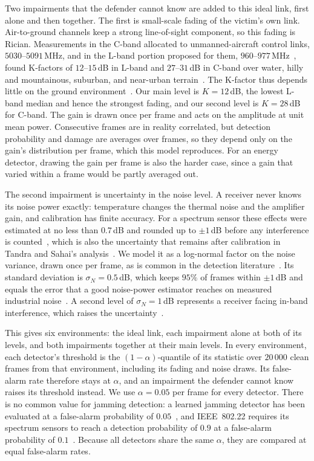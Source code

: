 Two impairments that the defender cannot know are added to this ideal link, first alone and then together.
The first is small-scale fading of the victim's own link.
Air-to-ground channels keep a strong line-of-sight component, so this fading is Rician.
Measurements in the C-band allocated to unmanned-aircraft control links, $5030$--$5091$\,MHz, and in the L-band portion proposed for them, $960$--$977$\,MHz~\cite{kerczewski2015cosite}, found K-factors of $12$--$15$\,dB in L-band and $27$--$31$\,dB in C-band over water, hilly and mountainous, suburban, and near-urban terrain~\cite{matolak2017airground1,sun2017airground2,matolak2017airground3}.
The K-factor thus depends little on the ground environment~\cite{khawaja2019survey}.
Our main level is $K=12$\,dB, the lowest L-band median and hence the strongest fading, and our second level is $K=28$\,dB for C-band.
The gain is drawn once per frame and acts on the amplitude at unit mean power.
Consecutive frames are in reality correlated, but detection probability and damage are averages over frames, so they depend only on the gain's distribution per frame, which this model reproduces.
For an energy detector, drawing the gain per frame is also the harder case, since a gain that varied within a frame would be partly averaged out.

The second impairment is uncertainty in the noise level.
A receiver never knows its noise power exactly: temperature changes the thermal noise and the amplifier gain, and calibration has finite accuracy.
For a spectrum sensor these effects were estimated at no less than $0.7$\,dB and rounded up to $\pm1$\,dB before any interference is counted~\cite{shellhammer2006noise}, which is also the uncertainty that remains after calibration in Tandra and Sahai's analysis~\cite{tandra2008snr}.
We model it as a log-normal factor on the noise variance, drawn once per frame, as is common in the detection literature~\cite{sonnenschein1992radiometric,he2017covert}.
Its standard deviation is $\sigma_N=0.5$\,dB, which keeps $95\%$ of frames within $\pm1$\,dB and equals the error that a good noise-power estimator reaches on measured industrial noise~\cite{nikonowicz2019noise}.
A second level of $\sigma_N=1$\,dB represents a receiver facing in-band interference, which raises the uncertainty~\cite{shellhammer2006noise,tandra2008snr}.

This gives six environments: the ideal link, each impairment alone at both of its levels, and both impairments together at their main levels.
In every environment, each detector's threshold is the $(1-\alpha)$-quantile of its statistic over $20\,000$ clean frames from that environment, including its fading and noise draws.
Its false-alarm rate therefore stays at $\alpha$, and an impairment the defender cannot know raises its threshold instead.
We use $\alpha=0.05$ per frame for every detector.
There is no common value for jamming detection: a learned jamming detector has been evaluated at a false-alarm probability of $0.05$~\cite{arcangeloni2024jamming}, and IEEE~802.22 requires its spectrum sensors to reach a detection probability of $0.9$ at a false-alarm probability of $0.1$~\cite{stevenson2009ieee}.
Because all detectors share the same $\alpha$, they are compared at equal false-alarm rates.

